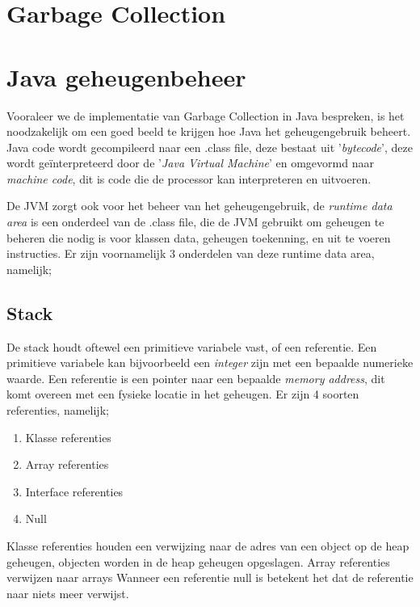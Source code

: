 \section{Garbage Collection}
\label{sec:Garbage collection}


\section{Java geheugenbeheer}
\label{sec:java geheugenbeheer}
Vooraleer we de implementatie van Garbage Collection in Java bespreken, is het noodzakelijk om een goed beeld te krijgen hoe Java het geheugengebruik beheert.
Java code wordt gecompileerd naar een .class file, deze bestaat uit '\textit{bytecode}', deze wordt geïnterpreteerd door de '\textit{Java Virtual Machine}' en omgevormd naar \textit{machine code}, dit is code die de processor kan interpreteren en uitvoeren.

De JVM zorgt ook voor het beheer van het geheugengebruik, de \textit{runtime data area} is een onderdeel van de .class file, die de JVM gebruikt om geheugen te beheren die nodig is voor klassen data, geheugen toekenning, en uit te voeren instructies.\autocite{Putten2022}
Er zijn voornamelijk 3 onderdelen van deze runtime data area, namelijk;

    \subsection{Stack}
    \label{sec:Stack}
    
    De stack houdt oftewel een primitieve variabele vast, of een referentie.
    Een primitieve variabele kan bijvoorbeeld een \textit{integer} zijn met een bepaalde numerieke waarde.
    Een referentie is een pointer naar een bepaalde \textit{memory address}, dit komt overeen met een fysieke locatie in het geheugen.\autocite{Huck1993}
    Er zijn 4 soorten referenties, namelijk;
    \begin{enumerate}
        \item Klasse referenties
        \item Array referenties
        \item Interface referenties
        \item Null
    \end{enumerate}
    Klasse referenties houden een verwijzing naar de adres van een object op de heap geheugen, objecten worden in de heap geheugen opgeslagen.
    Array referenties verwijzen naar arrays
    Wanneer een referentie null is betekent het dat de referentie naar niets meer verwijst.
    
